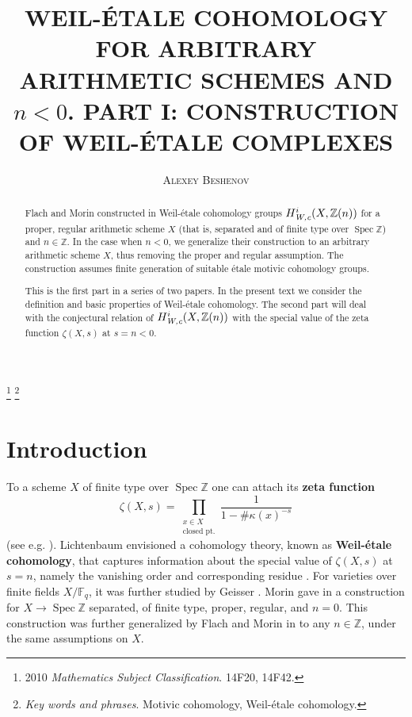 \documentclass[draft,leqno,12pt]{article}
\title{\uppercase{Weil-\'{e}tale cohomology for arbitrary arithmetic schemes and $n < 0$.
    Part I: Construction of Weil-\'{e}tale complexes}}
\author{\textsc{Alexey Beshenov}}
\date{}
\theoremstyle{plain}
\theoremstyle{definition}
\DeclareMathOperator{\Spec}{Spec}
\newcommand{\ZZ}{\mathbb{Z}}
\newcommand{\FF}{\mathbb{F}}
\newcommand{\Wc}{\text{\it W,c}}
\begin{document}
\maketitle

\footnote{ %
2010 \textit{Mathematics Subject Classification}.
14F20, 14F42.}
\footnote{ %
  \textit{Key words and phrases}.
  Motivic cohomology, Weil-\'{e}tale cohomology.}


\begin{abstract}
  Flach and Morin constructed in \cite{Flach-Morin-2018} Weil-\'{e}tale
  cohomology groups $H^i_\Wc (X, \ZZ(n))$ for a proper, regular arithmetic
  scheme $X$ (that is, separated and of finite type over $\Spec \ZZ$) and
  $n \in \ZZ$. In the case when $n < 0$, we generalize their construction to an
  arbitrary arithmetic scheme $X$, thus removing the proper and regular
  assumption. The construction assumes finite generation of suitable \'{e}tale
  motivic cohomology groups.

  This is the first part in a series of two papers. In the present text we
  consider the definition and basic properties of Weil-\'{e}tale cohomology. The
  second part will deal with the conjectural relation of $H^i_\Wc (X, \ZZ(n))$
  with the special value of the zeta function $\zeta (X,s)$ at $s = n < 0$.
\end{abstract}

\section{Introduction}

To a scheme $X$ of finite type over $\Spec \ZZ$ one can attach its
\textbf{zeta function}
$$\zeta (X,s) = \prod_{\substack{x \in X \\ \text{closed pt.}}} \frac{1}{1 - \#\kappa (x)^{-s}}$$
(see e.g. \cite{Serre-1965}). Lichtenbaum envisioned a cohomology theory, known
as \textbf{Weil-\'{e}tale cohomology}, that captures information about the special
value of $\zeta (X,s)$ at $s = n$, namely the vanishing order and corresponding
residue
\cite{Lichtenbaum-2005,Lichtenbaum-2009-number-rings,Lichtenbaum-2009-Euler-char}.
For varieties over finite fields $X/\FF_q$, it was further studied by Geisser
\cite{Geisser-2004,Geisser-2006,Geisser-2010-arithmetic-homology}.
Morin gave in \cite{Morin-2014} a construction for $X \to \Spec\ZZ$ separated,
of finite type, proper, regular, and $n = 0$. This construction was further
generalized by Flach and Morin in \cite{Flach-Morin-2018} to any $n \in \ZZ$,
under the same assumptions on $X$.
\end{document}
